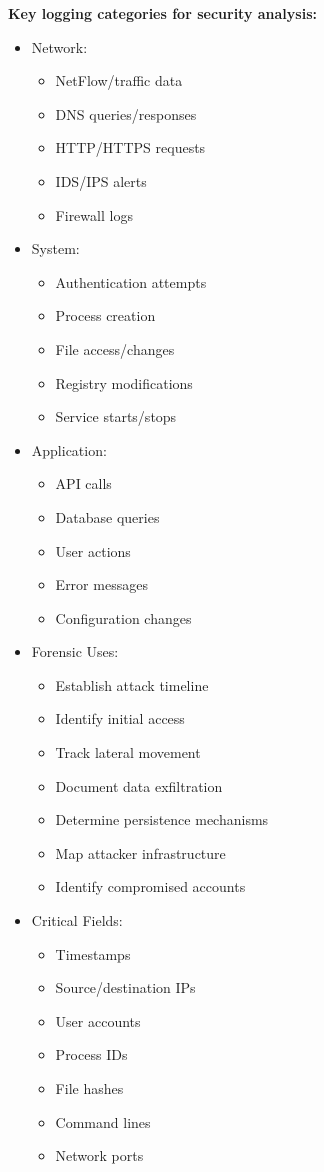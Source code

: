 \textbf{Key logging categories for security analysis:}
\begin{itemize}
  \item Network:
  \begin{itemize}
    \tightlist
		\item NetFlow/traffic data
		\item DNS queries/responses
		\item HTTP/HTTPS requests
		\item IDS/IPS alerts
		\item Firewall logs
  \end{itemize}

  \item System:
  \begin{itemize}
    \tightlist
		\item Authentication attempts
		\item Process creation
		\item File access/changes
		\item Registry modifications
		\item Service starts/stops
  \end{itemize}

  \item Application:
  \begin{itemize}
    \tightlist
		\item API calls
		\item Database queries
		\item User actions
		\item Error messages
		\item Configuration changes
  \end{itemize}

  \item Forensic Uses:
  \begin{itemize}
    \tightlist
		\item Establish attack timeline
		\item Identify initial access
		\item Track lateral movement
		\item Document data exfiltration
		\item Determine persistence mechanisms
		\item Map attacker infrastructure
		\item Identify compromised accounts
  \end{itemize}

  \item Critical Fields:
  \begin{itemize}
    \tightlist
		\item Timestamps
		\item Source/destination IPs
		\item User accounts
		\item Process IDs
		\item File hashes
		\item Command lines
		\item Network ports
  \end{itemize}
\end{itemize}

